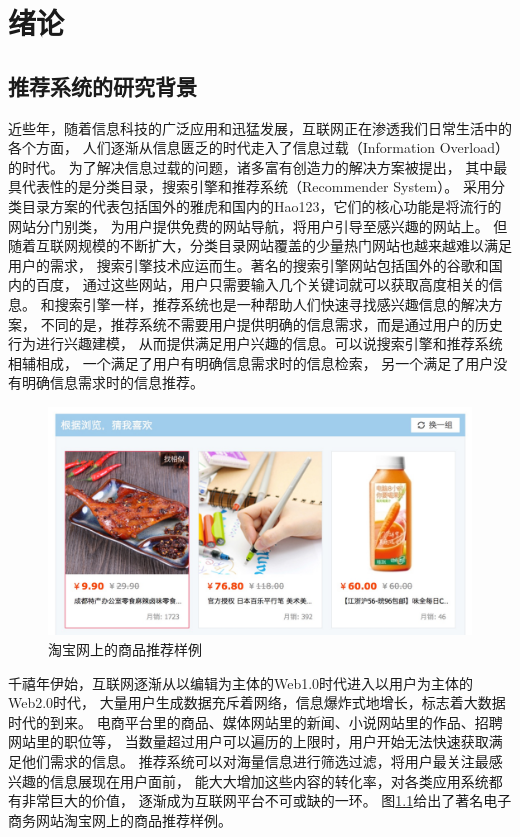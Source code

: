 \chapter{绪论}
\section{推荐系统的研究背景}
近些年，随着信息科技的广泛应用和迅猛发展，互联网正在渗透我们日常生活中的各个方面，
人们逐渐从信息匮乏的时代走入了信息过载（Information Overload）的时代。
为了解决信息过载的问题，诸多富有创造力的解决方案被提出，
其中最具代表性的是分类目录，搜索引擎和推荐系统（Recommender System）。
采用分类目录方案的代表包括国外的雅虎和国内的Hao123，它们的核心功能是将流行的网站分门别类，
为用户提供免费的网站导航，将用户引导至感兴趣的网站上。
但随着互联网规模的不断扩大，分类目录网站覆盖的少量热门网站也越来越难以满足用户的需求，
搜索引擎技术应运而生。著名的搜索引擎网站包括国外的谷歌和国内的百度，
通过这些网站，用户只需要输入几个关键词就可以获取高度相关的信息。
和搜索引擎一样，推荐系统也是一种帮助人们快速寻找感兴趣信息的解决方案，
不同的是，推荐系统不需要用户提供明确的信息需求，而是通过用户的历史行为进行兴趣建模，
从而提供满足用户兴趣的信息。可以说搜索引擎和推荐系统相辅相成，
一个满足了用户有明确信息需求时的信息检索，
另一个满足了用户没有明确信息需求时的信息推荐。

\begin{figure}[htbp]
\centering
\includegraphics[scale=0.26]{images/taobao.jpeg}
\caption{淘宝网上的商品推荐样例}
\label{fig:taobao}
\end{figure}

千禧年伊始，互联网逐渐从以编辑为主体的Web1.0时代进入以用户为主体的Web2.0时代，
大量用户生成数据充斥着网络，信息爆炸式地增长，标志着大数据时代的到来。
电商平台里的商品、媒体网站里的新闻、小说网站里的作品、招聘网站里的职位等，
当数量超过用户可以遍历的上限时，用户开始无法快速获取满足他们需求的信息。
推荐系统可以对海量信息进行筛选过滤，将用户最关注最感兴趣的信息展现在用户面前，
能大大增加这些内容的转化率，对各类应用系统都有非常巨大的价值，
逐渐成为互联网平台不可或缺的一环。
图\ref{fig:taobao}给出了著名电子商务网站淘宝网上的商品推荐样例。

